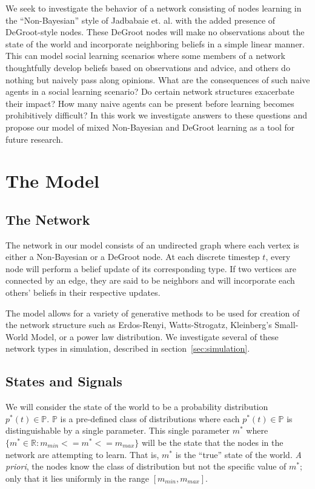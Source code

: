 \documentclass[letterpaper, 10pt, conference]{ieeeconf}
\begin{document}
We seek to investigate the behavior of a network consisting of nodes learning in the ``Non-Bayesian'' style of Jadbabaie et. al. with the added presence of DeGroot-style nodes.  These DeGroot nodes will make no observations about the state of the world and incorporate neighboring beliefs in a simple linear manner.  This can model social learning scenarios where some members of a network thoughtfully develop beliefs based on observations and advice, and others do nothing but naively pass along opinions.  What are the consequences of such naive agents in a social learning scenario?  Do certain network structures exacerbate their impact?  How many naive agents can be present before learning becomes prohibitively difficult?  In this work we investigate answers to these questions and propose our model of mixed Non-Bayesian and DeGroot learning as a tool for future research.

\section{The Model}

\subsection{The Network}

The network in our model consists of an undirected graph where each vertex is either a Non-Bayesian or a DeGroot node.  At each discrete timestep $t$, every node will perform a belief update of its corresponding type.  If two vertices are connected by an edge, they are said to be neighbors and will incorporate each others' beliefs in their respective updates.

The model allows for a variety of generative methods to be used for creation of the network structure such as Erdos-Renyi, Watts-Strogatz, Kleinberg's Small-World Model, or a power law distribution.  We investigate several of these network types in simulation, described in section~\ref{sec:simulation}.

\subsection{States and Signals}

We will consider the state of the world to be a probability distribution $p^*(t) \in \mathbb{P}$.  $\mathbb{P}$ is a pre-defined class of distributions where each  $p^*(t) \in \mathbb{P}$ is distinguishable by a single parameter.  This single parameter $m^*$ where $\{m^* \in \mathbb{R}: m_{min} <= m^* <= m_{max} \}$  will be the state that the nodes in the network are attempting to learn.  That is, $m^*$ is the ``true'' state of the world.  \emph{A priori}, the nodes know the class of distribution but not the specific value of $m^*$; only that it lies uniformly in the range $[m_{min}, m_{max}]$.
\end{document}
